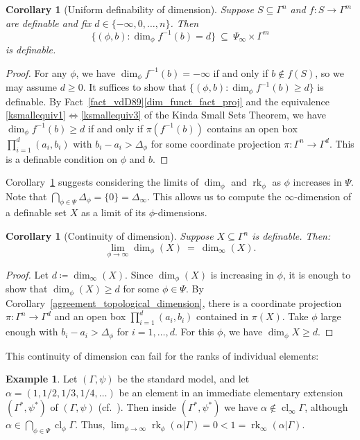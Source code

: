 \documentclass[11pt]{amsart}
\theoremstyle{plain}
\newtheorem{cor}[thm]{Corollary}
\theoremstyle{definition}
\newtheorem{example}[thm]{Example}
\numberwithin{equation}{section}
\newcommand\0{\varnothing}
\DeclareMathOperator\cl{cl}
\DeclareMathOperator\rk{rk}
\begin{document}
\begin{cor}[Uniform definability of dimension]\label{uniform_definability_of_dimension}
Suppose $S\subseteq \Gamma^n$ and $f\colon S\to\Gamma^m$ are definable and fix $d\in\{-\infty,0,\ldots,n\}$. Then
\[
\{(\phi,b):\dim_{\phi}f^{-1}(b)=d\} \ \subseteq \ \Psi_{\infty}\times\Gamma^m
\]
is definable.
\end{cor}
\begin{proof}
For any $\phi$, we have $\dim_\phi f^{-1}(b) = -\infty$ if and only if $b \not\in f(S)$, so we may assume $d \geq 0$. It suffices to show that $\{(\phi,b):\dim_{\phi}f^{-1}(b)\geq d\}$ is definable. By Fact~\ref{fact_vdD89}\eqref{dim_funct_fact_proj} and the equivalence \eqref{ksmallequiv1}$\Leftrightarrow$\eqref{ksmallequiv3} of the Kinda Small Sets Theorem, we have $\dim_{\phi}f^{-1}(b)\geq d$ if and only if $\pi(f^{-1}(b))$ contains an open box $\prod_{i=1}^d(a_i,b_i)$ with $b_i-a_i>\Delta_\phi$ for some coordinate projection $\pi\colon \Gamma^n\to \Gamma^d$. This is a definable condition on $\phi$ and $b$. 
\end{proof}

\noindent
Corollary~\ref{uniform_definability_of_dimension} suggests considering the limits of $\dim_\phi$ and $\rk_\phi$ as $\phi$ increases in $\Psi$.
Note that $\bigcap_{\phi\in\Psi}\Delta_{\phi}=\{0\} = \Delta_{\infty}$. This allows us to compute the $\infty$-dimension of a definable set $X$ as a limit of its $\phi$-dimensions. 




\begin{cor}[Continuity of dimension]
Suppose $X\subseteq\Gamma^n$ is definable. Then:
\[
\lim_{\phi\to\infty}\dim_{\phi}(X) \ = \ \dim_{\infty}(X).
\]
\end{cor}
\begin{proof}
Let $d \coloneqq \dim_\infty(X)$. Since $\dim_\phi(X)$ is increasing in $\phi$, it is enough to show that $\dim_\phi(X) \geq d$ for some $\phi \in \Psi$. By Corollary~\ref{agreement_topological_dimension}, there is a coordinate projection $\pi\colon \Gamma^n\to \Gamma^d$ and an open box $\prod_{i=1}^d(a_i,b_i)$ contained in $\pi(X)$. Take $\phi$ large enough with $b_i-a_i>\Delta_\phi$ for $i = 1,\ldots,d$. For this $\phi$, we have $\dim_\phi X \geq d$. 
\end{proof}

\noindent
This continuity of dimension can fail for the ranks of individual elements:

\begin{example}
Let $(\Gamma,\psi)$ be the standard model, and let $\alpha=(1,1/2,1/3,1/4,\ldots)$ be an element in an immediate elementary extension $(\Gamma^*,\psi^*)$ of $(\Gamma,\psi)$ (cf.~\cite[Example 2]{GehretACTlogNIP}). Then inside $(\Gamma^*,\psi^*)$ we have $\alpha\not\in\cl_{\infty}\Gamma$, although $\alpha\in\bigcap_{\phi\in\Psi}\cl_{\phi}\Gamma$. Thus, 
$\lim_{\phi\to\infty}\operatorname{rk}_\phi(\alpha|\Gamma)=0<1=\operatorname{rk}_{\infty}(\alpha|\Gamma)$.
\end{example}
\end{document}
